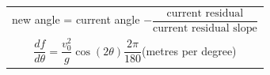 \documentclass[border=12pt]{standalone}
\begin{document}
\color{weeknavy}
\begin{tabular}{c}
new angle = current angle $-\dfrac{\text{current residual}}{\text{current residual slope}}$\\[9pt]
$\dfrac{df}{d\theta}=\dfrac{v_0^2}{g}\cos(2\theta)\dfrac{2\pi}{180}$\qquad (metres per degree)
\end{tabular}
\end{document}
